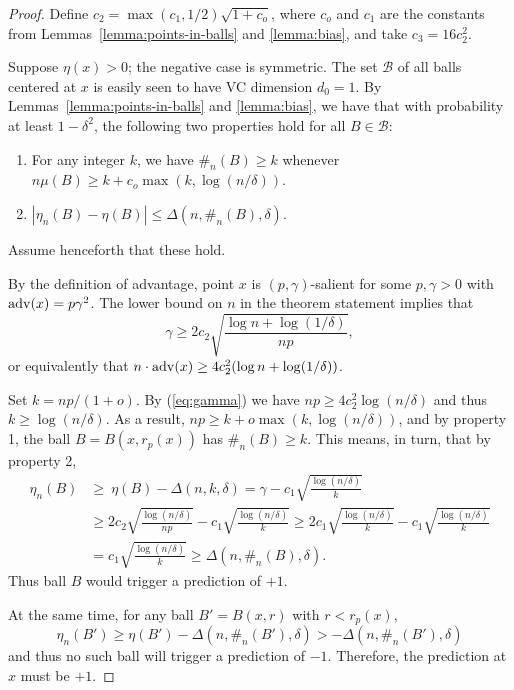 \documentclass{article}
\def\B{{\mathcal B}}
\def\supp{{\rm supp}}
\def\adv{{\rm adv}}
\newtheorem{lemma}[theorem]{Lemma}
\begin{document}
\begin{proof}
Define $c_2 = \max(c_1, 1/2) \sqrt{1+c_o}$, where $c_o$ and $c_1$ are the constants from Lemmas~\ref{lemma:points-in-balls} and \ref{lemma:bias}, and take $c_3 = 16 c_2^2$.

Suppose $\eta(x) > 0$; the negative case is symmetric. The set $\B$ of all balls centered at $x$ is easily seen to have VC dimension $d_0 = 1$. By Lemmas~\ref{lemma:points-in-balls} and \ref{lemma:bias}, we have that with probability at least $1-\delta^2$, the following two properties hold for all $B \in \B$:
\begin{enumerate}
\item For any integer $k$, we have $\#_n(B) \geq k$ whenever $n \mu(B) \geq k + c_o \max(k, \log (n/\delta))$.
\item $|\eta_n(B) - \eta(B)| \leq \Delta(n, \#_n(B), \delta)$.
\end{enumerate}
Assume henceforth that these hold.

By the definition of advantage, point $x$ is $(p,\gamma)$-salient for some $p,\gamma> 0$ with $\adv(x) = p\gamma^2$. The lower bound on $n$ in the theorem statement implies that
\begin{equation}
\gamma \geq 2c_2 \sqrt{\frac{\log n + \log (1/\delta)}{np}} ,
\label{eq:gamma}
\end{equation}
or equivalently that $n \cdot \adv(x) \geq 4c_2^2 (\log n + \log (1/\delta))$.

Set $k = np/(1 + o)$. By (\ref{eq:gamma}) we have $np \geq 4 c_2^2 \log (n/\delta)$ and thus $k \geq \log (n/\delta)$. As a result, $np \geq k + o \max(k, \log (n/\delta))$, and by property 1, the ball $B = B(x, r_p(x))$ has $\#_n(B) \geq k$. This means, in turn, that by property 2,
\begin{align*}
\eta_n(B) &\geq \ \eta(B) - \Delta(n, k, \delta)
= \gamma - c_1 \sqrt{\frac{\log (n/\delta)}{k}} \\
&\geq 2c_2 \sqrt{\frac{\log (n/\delta)}{np}} - c_1 \sqrt{\frac{\log (n/\delta)}{k}}
\geq 2c_1 \sqrt{\frac{\log (n/\delta)}{k}} - c_1 \sqrt{\frac{\log (n/\delta)}{k}} \\
&= c_1 \sqrt{\frac{\log (n/\delta)}{k}} \geq \Delta(n, \#_n(B), \delta) .
\end{align*}
Thus ball $B$ would trigger a prediction of $+1$.

At the same time, for any ball $B' = B(x, r)$ with $r < r_p(x)$,
$$ \eta_n(B') \geq \eta(B') - \Delta(n, \#_n(B'), \delta) > -\Delta(n, \#_n(B'), \delta) $$
and thus no such ball will trigger a prediction of $-1$. Therefore, the prediction at $x$ must be $+1$.
\end{proof}
\end{document}
